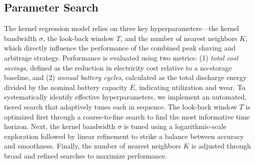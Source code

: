 \documentclass[conference]{IEEEtran}
\begin{document}
\subsection{Parameter Search}\label{parameter_search}
The kernel regression model relies on three key hyperparameters—the kernel bandwidth $\sigma$, the look-back window $T$, and the number of nearest neighbors $K$, which directly influence the performance of the combined peak shaving and arbitrage strategy. Performance is evaluated using two metrics: (1) \textit{total cost savings}, defined as the reduction in electricity cost relative to a no-storage baseline, and (2) \textit{annual battery cycles}, calculated as the total discharge energy divided by the nominal battery capacity $\overline{E}$, indicating utilization and wear. %
To systematically identify effective hyperparameters, we implement an automated, tiered search that adaptively tunes each in sequence. The look-back window $T$ is optimized first through a coarse-to-fine search to find the most informative time horizon. Next, the kernel bandwidth $\sigma$ is tuned using a logarithmic-scale exploration followed by linear refinement to strike a balance between accuracy and smoothness. Finally, the number of nearest neighbors $K$ is adjusted through broad and refined searches to maximize performance. 




\end{document}
